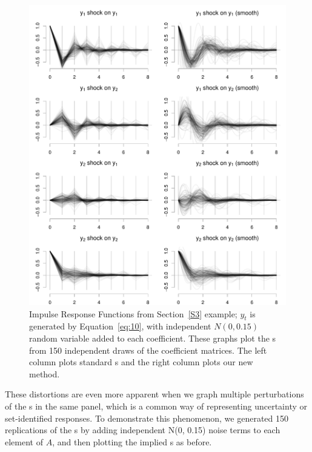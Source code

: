 \documentclass[12pt,fleqn]{article}
\begin{document}
\begin{figure}[t]
  \centering
  \includegraphics{graphs/numeric2.pdf}
  \caption{Impulse Response Functions from Section~\ref{S3}
    example; $y_t$ is generated by Equation~\eqref{eq:10}, with
    independent $N(0,0.15)$ random variable added to each
    coefficient. These graphs plot the \IRF s from 150 independent
    draws of the coefficient matrices. The left column plots standard
    \IRF s and the right column plots our new method.}
  \label{fig:4}
\end{figure}

These distortions are even more apparent when we graph multiple
perturbations of the \IRF s in the same panel, which is a common way
of representing uncertainty or set-identified responses. To
demonstrate this phenomenon, we generated 150 replications of the \IRF
s by adding independent N(0, 0.15) noise terms to each element of $A$,
and then plotting the implied \IRF s as before.
\end{document}
